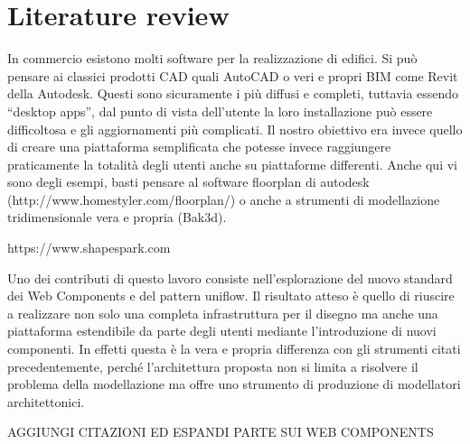 \section{Literature review}

In commercio esistono molti software per la realizzazione di edifici. Si può pensare ai classici prodotti CAD quali AutoCAD o veri e propri BIM come Revit della Autodesk. Questi sono sicuramente i più diffusi e completi, tuttavia essendo “desktop apps”, dal punto di vista dell’utente la loro installazione può essere difficoltosa e gli aggiornamenti più complicati. Il nostro obiettivo era invece quello di creare una piattaforma semplificata che potesse invece raggiungere praticamente la totalità degli utenti anche su piattaforme differenti. Anche qui vi sono degli esempi, basti pensare al software floorplan di autodesk (http://www.homestyler.com/floorplan/) o anche a strumenti di modellazione tridimensionale vera e propria (Bak3d). 

https://www.shapespark.com

Uno dei contributi di questo lavoro consiste nell’esplorazione del nuovo standard dei Web Components e del pattern uniflow. Il risultato atteso è quello di riuscire a realizzare non solo una completa infrastruttura per il disegno ma anche una piattaforma estendibile da parte degli utenti mediante l’introduzione di nuovi componenti. In effetti questa è la vera e propria differenza con gli strumenti citati precedentemente, perché l’architettura proposta non si limita a risolvere il problema della modellazione ma offre uno strumento di produzione di modellatori architettonici.


AGGIUNGI CITAZIONI ED ESPANDI PARTE SUI WEB COMPONENTS